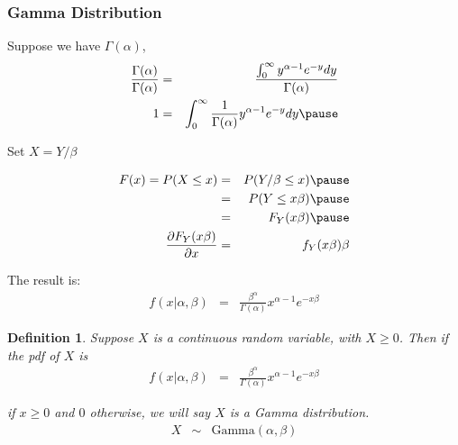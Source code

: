 \documentclass{beamer}
\newtheorem{defn}{Definition}
\numberwithin{equation}{section}
\begin{document}
\begin{frame}
\frametitle{Gamma Distribution}

Suppose we have $\Gamma(\alpha)$,  \pause 
\begin{eqnarray}
\frac{\Gamma(\alpha)}{\Gamma(\alpha)} & = & \frac{\int_{0}^{\infty} y^{\alpha-1} e^{-y} dy}{\Gamma(\alpha)} \nonumber \\
1 & = & \int_{0}^{\infty} \frac{1}{\Gamma(\alpha)} y^{\alpha-1} e^{-y} dy \nonumber  \pause 
\end{eqnarray}

Set $X = Y/\beta$ \pause 

\begin{eqnarray}
F(x) = P(X \leq x) & = & P(Y/\beta \leq x ) \nonumber \pause\\
& = & P(Y \leq x \beta ) \nonumber \pause\\
 & = & F_{Y} (x \beta) \nonumber \pause\\
\frac{\partial F_{Y} (x \beta) }{\partial x} & = & f_{Y} (x \beta) \beta \nonumber 
\end{eqnarray}

The result is: \pause 
 \begin{eqnarray}
f(x|\alpha, \beta) & = & \frac{\beta^{\alpha}}{\Gamma(\alpha)} x^{\alpha - 1} e^{-x\beta}  \nonumber 
 \end{eqnarray}



\end{frame}


\begin{frame}

\begin{defn}
Suppose $X$ is a continuous random variable, with $X \geq 0$.  Then if the pdf of $X$ is 
 \begin{eqnarray}
f(x|\alpha, \beta) & = & \frac{\beta^{\alpha}}{\Gamma(\alpha)} x^{\alpha - 1} e^{-x\beta}  \nonumber 
 \end{eqnarray}

if $x\geq 0$ and $0$ otherwise, we will say $X$ is a Gamma distribution. 
\begin{eqnarray}
X & \sim & \text{Gamma}(\alpha, \beta) \nonumber 
\end{eqnarray}

\end{defn}


\end{frame}
\end{document}
